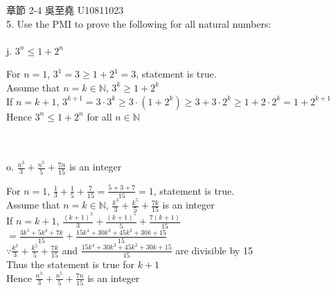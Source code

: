 \documentclass[12pt]{book}
\author{andersonwu2000}
\begin{document}
\begin{CJK}{UTF8}{bsmi}

\hfill 章節 2-4 吳至堯 U10811023 \\

5. Use the PMI to prove the following for all natural numbers: \\\\
j. $3^n\leq1+2^n$ \\
\begin{minipage}[t]{\dimexpr\linewidth}
For $n=1$, $3^1=3\geq1+2^1=3$, statement is true. \\
Assume that $n=k\in\mathbb{N}$, $3^k\geq1+2^k$ \\
If $n=k+1$, $3^{k+1}=3\cdot3^k\geq3\cdot(1+2^k)\geq3+3\cdot2^k\geq1+2\cdot2^k=1+2^{k+1}$ \\
Hence $3^n\leq1+2^n$ for all $n\in\mathbb{N}$
\end{minipage} \\\\

o. $\displaystyle\frac{n^3}{3}+\frac{n^5}{5}+\frac{7n}{15}$ is an integer \\[5pt]
\begin{minipage}[t]{\dimexpr\linewidth}
For $n=1$, $\displaystyle\frac{1}{3}+\frac{1}{5}+\frac{7}{15}=\frac{5+3+7}{15}=1$, statement is true. \\[5pt]
Assume that $n=k\in\mathbb{N}$, $\displaystyle\frac{k^3}{3}+\frac{k^5}{5}+\frac{7k}{15}$ is an integer \\[5pt]
If $n=k+1$, $\displaystyle\frac{{(k+1)}^3}{3}+\frac{{(k+1)}^5}{5}+\frac{7(k+1)}{15}$ \\\hspace*{6em}$\displaystyle=\frac{3k^5+5k^3+7k}{15}+\frac{15k^4+30k^3+45k^2+30k+15}{15}$ \\[5pt]
$\displaystyle\because\frac{k^3}{3}+\frac{k^5}{5}+\frac{7k}{15}$ and $\displaystyle\frac{15k^4+30k^3+45k^2+30k+15}{15}$ are divisible by 15 \\
Thus the statement is true for $k+1$ \\[5pt]
Hence $\displaystyle\frac{n^3}{3}+\frac{n^5}{5}+\frac{7n}{15}$ is an integer
\end{minipage}

\end{CJK}
\end{document}
